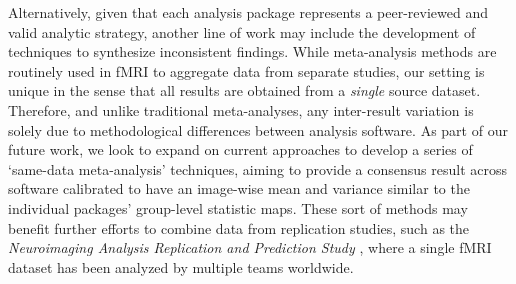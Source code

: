Alternatively, given that each analysis package represents a peer-reviewed and valid analytic strategy, another line of work may include the development of techniques to synthesize inconsistent findings. While meta-analysis methods are routinely used in fMRI to aggregate data from separate studies, our setting is unique in the sense that all results are obtained from a \textit{single} source dataset. Therefore, and unlike traditional meta-analyses, any inter-result variation is solely due to methodological differences between analysis software. As part of our future work, we look to expand on current approaches to develop a series of `same-data meta-analysis' techniques, aiming to provide a consensus result across software calibrated to have an image-wise mean and variance similar to the individual packages' group-level statistic maps. These sort of methods may benefit further efforts to combine data from replication studies, such as the \textit{Neuroimaging Analysis Replication and Prediction Study} \citep{Botvinik-Nezer2019-qu}, where a single fMRI dataset has been analyzed by multiple teams worldwide. 